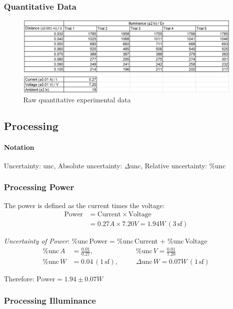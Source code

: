 \documentclass[a4paper,12pt]{article}
\newcommand{\absun}{\Delta \text{unc}\,}
\newcommand{\relun}{\% \text{unc}\,}
\newcommand{\tsf}{\,\text{sf}}
\begin{document}
\subsubsection*{Quantitative Data}
\begin{figure}[H]
    \centering
    \includegraphics[width=\textwidth]{assets/rawdata.png}
    \caption{Raw quantitative experimental data}
    \label{fig:raw}
\end{figure}

\subsection{Processing}
\paragraph{Notation}

Uncertainty: unc, Absolute uncertainty: $\Delta$unc, Relative uncertainty: \%unc


\subsubsection{Processing Power}
The power is defined as the current times the voltage:
\begin{align*}
\text{Power} &= \text{Current} \times \text{Voltage}\\
        &= 0.27\si{A} \times 7.20\si{V} = 1.94 \si{W} \,(3 \tsf)
\end{align*}

\textit{Uncertainty of Power}: $\relun$Power =  $\relun$Current +  $\relun$Voltage
\begin{alignat*}
    \relun \si{A} &= \frac{0.01}{0.27},\quad &&\relun \si{V} = \frac{0.01}{7.20}\\
    \relun \si{W} &= 0.04 \,(1 \tsf), \quad &&\absun \si{W} = 0.07\si{W} \,(1 \tsf)
\end{alignat*}

Therefore: $\text{Power} = 1.94 \pm 0.07 \si{W}$

\subsubsection{Processing Illuminance}
\end{document}
